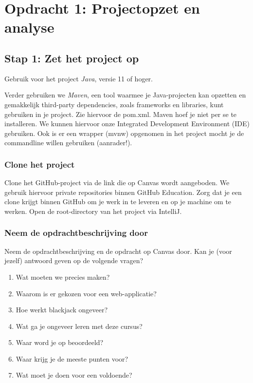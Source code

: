 \chapter{Opdracht 1: Projectopzet en analyse}

\section{Stap 1: Zet het project op}
Gebruik voor het project \textit{Java}, versie 11 of hoger.

Verder gebruiken we \textit{Maven}, een tool waarmee je Java-projecten kan opzetten
en gemakkelijk third-party dependencies, zoals frameworks en libraries, kunt 
gebruiken in je project. Zie hiervoor de pom.xml. Maven hoef je niet per se te 
installeren. We kunnen hiervoor onze Integrated Development Environment (IDE) gebruiken.
Ook is er een wrapper (mvnw) opgenomen in het project mocht je de commandline willen gebruiken (aanrader!). 

\subsection{Clone het project}
Clone het GitHub-project via de link die op Canvas wordt aangeboden.
We gebruik hiervoor private repositories binnen GitHub Education.
Zorg dat je een clone krijgt binnen GitHub om je werk in te leveren 
en op je machine om te werken. Open de root-directory van het project
via IntelliJ.

\subsection{Neem de opdrachtbeschrijving door}
Neem de opdrachtbeschrijving en de opdracht op Canvas door. 
Kan je (voor jezelf) antwoord geven op de volgende vragen?

\begin{enumerate}
    \item Wat moeten we precies maken?
    \item Waarom is er gekozen voor een web-applicatie?
    \item Hoe werkt blackjack ongeveer?
    \item Wat ga je ongeveer leren met deze cursus?
    \item Waar word je op beoordeeld?
    \item Waar krijg je de meeste punten voor?
    \item Wat moet je doen voor een voldoende?
\end{enumerate}

